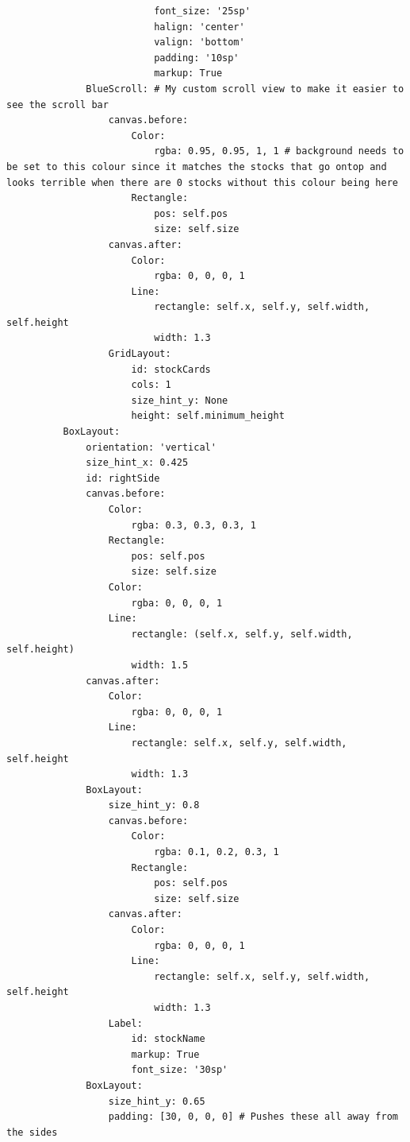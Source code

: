 \documentclass{article}
\begin{document}
\begin{verbatim}
                          font_size: '25sp'
                          halign: 'center'
                          valign: 'bottom'
                          padding: '10sp' 
                          markup: True
              BlueScroll: # My custom scroll view to make it easier to see the scroll bar
                  canvas.before:
                      Color:
                          rgba: 0.95, 0.95, 1, 1 # background needs to be set to this colour since it matches the stocks that go ontop and looks terrible when there are 0 stocks without this colour being here
                      Rectangle:
                          pos: self.pos
                          size: self.size
                  canvas.after:
                      Color:
                          rgba: 0, 0, 0, 1
                      Line:
                          rectangle: self.x, self.y, self.width, self.height
                          width: 1.3
                  GridLayout:
                      id: stockCards
                      cols: 1
                      size_hint_y: None
                      height: self.minimum_height
          BoxLayout:
              orientation: 'vertical'
              size_hint_x: 0.425
              id: rightSide
              canvas.before:
                  Color:
                      rgba: 0.3, 0.3, 0.3, 1
                  Rectangle:
                      pos: self.pos
                      size: self.size
                  Color:
                      rgba: 0, 0, 0, 1 
                  Line:
                      rectangle: (self.x, self.y, self.width, self.height)
                      width: 1.5
              canvas.after:
                  Color:
                      rgba: 0, 0, 0, 1
                  Line:
                      rectangle: self.x, self.y, self.width, self.height
                      width: 1.3
              BoxLayout:
                  size_hint_y: 0.8
                  canvas.before:
                      Color:
                          rgba: 0.1, 0.2, 0.3, 1
                      Rectangle:
                          pos: self.pos
                          size: self.size
                  canvas.after:
                      Color:
                          rgba: 0, 0, 0, 1
                      Line:
                          rectangle: self.x, self.y, self.width, self.height
                          width: 1.3
                  Label:
                      id: stockName
                      markup: True
                      font_size: '30sp'
              BoxLayout:
                  size_hint_y: 0.65
                  padding: [30, 0, 0, 0] # Pushes these all away from the sides

\end{verbatim}
\end{document}
